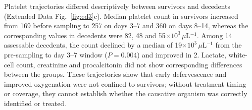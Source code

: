 Platelet trajectories differed descriptively between survivors and decedents (Extended Data Fig.~\ref{fig:ed3}c). Median platelet count in survivors increased from 169 before sampling to 257 on days 3--7 and 360 on days 8--14, whereas the corresponding values in decedents were 82, 48 and 55$\times10^{3}\,\mu$L$^{-1}$. Among 14 assessable decedents, the count declined by a median of 19$\times10^{3}\,\mu$L$^{-1}$ from the pre-sampling to day 3--7 window ($P = 0.004$) and improved in 2. Lactate, white-cell count, creatinine and procalcitonin did not show corresponding differences between the groups. These trajectories show that early defervescence and improved oxygenation were not confined to survivors; without treatment timing or coverage, they cannot establish whether the causative organism was correctly identified or treated.
